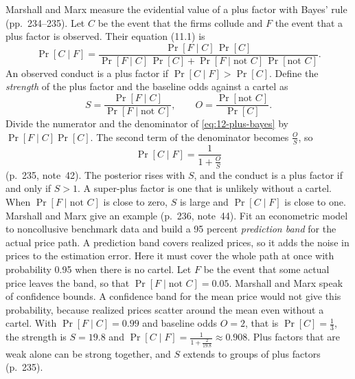 Marshall and Marx measure the evidential value of a plus factor with Bayes' rule (pp.~234--235). Let $C$ be the event
that the firms collude and $F$ the event that a plus factor is observed. Their equation (11.1) is
\begin{equation}\label{eq:12-plus-bayes}
\Pr[C \mid F] = \frac{\Pr[F \mid C]\,\Pr[C]}{\Pr[F \mid C]\,\Pr[C] + \Pr[F \mid \text{not } C]\,\Pr[\text{not } C]} .
\end{equation}
An observed conduct is a plus factor if $\Pr[C \mid F] > \Pr[C]$. Define the \emph{strength} of the plus factor and
the baseline odds against a cartel as
\begin{equation*}
S = \frac{\Pr[F \mid C]}{\Pr[F \mid \text{not } C]} ,
\qquad
O = \frac{\Pr[\text{not } C]}{\Pr[C]} .
\end{equation*}
Divide the numerator and the denominator of \eqref{eq:12-plus-bayes} by $\Pr[F \mid C]\Pr[C]$. The second term of the
denominator becomes $\frac{O}{S}$, so
\begin{equation}\label{eq:12-plus-strength}
\Pr[C \mid F] = \frac{1}{1 + \frac{O}{S}}
\end{equation}
(p.~235, note~42). The posterior rises with $S$, and the conduct is a plus factor if and only if $S > 1$. A
super-plus factor is one that is unlikely without a cartel. When $\Pr[F \mid \text{not } C]$ is close to zero, $S$ is
large and $\Pr[C \mid F]$ is close to one. Marshall and Marx give an example (p.~236, note~44). Fit an econometric
model to noncollusive benchmark data and build a 95 percent \emph{prediction band} for the actual price path. A
prediction band covers realized prices, so it adds the noise in prices to the estimation error. Here it must cover
the whole path at once with probability 0.95 when there is no cartel. Let $F$ be the event that some actual price
leaves the band, so that $\Pr[F \mid \text{not } C] = 0.05$. Marshall and Marx speak of confidence bounds. A
confidence band for the mean price would not give this probability, because realized prices scatter around the mean
even without a cartel. With
$\Pr[F \mid C] = 0.99$ and baseline odds $O = 2$, that is $\Pr[C] = \frac{1}{3}$,
the strength is $S = 19.8$ and $\Pr[C \mid F] = \frac{1}{1 + \frac{2}{19.8}} \approx 0.908$. Plus factors that are weak
alone can be strong together, and $S$ extends to groups of plus factors (p.~235).


